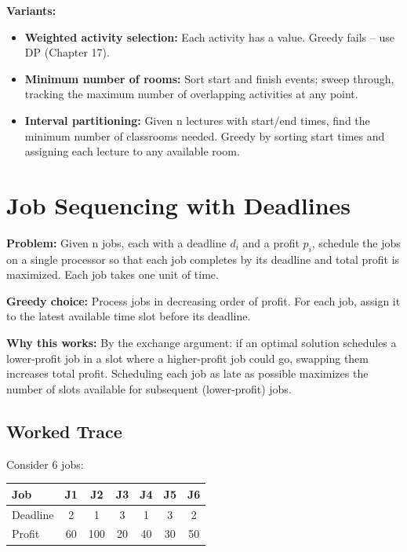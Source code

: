 \textbf{Variants:}
\begin{itemize}
\item \textbf{Weighted activity selection:} Each activity has a value. Greedy fails -- use DP (Chapter 17).
\item \textbf{Minimum number of rooms:} Sort start and finish events; sweep through, tracking the maximum number of overlapping activities at any point.
\item \textbf{Interval partitioning:} Given n lectures with start/end times, find the minimum number of classrooms needed. Greedy by sorting start times and assigning each lecture to any available room.
\end{itemize}

\section{Job Sequencing with Deadlines}

\textbf{Problem:} Given n jobs, each with a deadline $d_i$ and a profit $p_i$, schedule the jobs on a single processor so that each job completes by its deadline and total profit is maximized. Each job takes one unit of time.

\textbf{Greedy choice:} Process jobs in decreasing order of profit. For each job, assign it to the latest available time slot before its deadline.

\textbf{Why this works:} By the exchange argument: if an optimal solution schedules a lower-profit job in a slot where a higher-profit job could go, swapping them increases total profit. Scheduling each job as late as possible maximizes the number of slots available for subsequent (lower-profit) jobs.

\subsection{Worked Trace}

Consider 6 jobs:

\begin{center}
\begin{tabular}{lcccccc}
\toprule
Job  & J1 & J2 & J3 & J4 & J5 & J6 \\
\midrule
Deadline  & 2  & 1  & 3  & 1  & 3  & 2 \\
Profit    & 60 & 100 & 20 & 40 & 30 & 50 \\
\bottomrule
\end{tabular}
\end{center}

